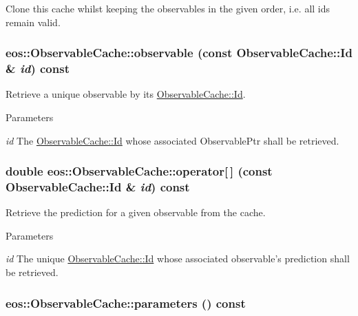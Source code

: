 Clone this cache whilst keeping the observables in the given order, i.e. all ids remain valid. \hypertarget{classeos_1_1ObservableCache_a171e7c1c0e4e2741dc155e4b249bca6d}{
\subsubsection[{observable}]{ eos::ObservableCache::observable (const {\bf ObservableCache::Id} \& {\em id}) const}}
\label{classeos_1_1ObservableCache_a171e7c1c0e4e2741dc155e4b249bca6d}
Retrieve a unique observable by its \hyperlink{classeos_1_1ObservableCache_a393f1d7c8c2a58bc95845e12b615c6ee}{ObservableCache::Id}.


\begin{DoxyParams}{Parameters}
\item[{\em id}]The \hyperlink{classeos_1_1ObservableCache_a393f1d7c8c2a58bc95845e12b615c6ee}{ObservableCache::Id} whose associated ObservablePtr shall be retrieved. \end{DoxyParams}
\hypertarget{classeos_1_1ObservableCache_a9ad7f1672817b0d69bda7dfc9471bc43}{
\subsubsection[{operator[]}]{\setlength{\rightskip}{0pt plus 5cm}double eos::ObservableCache::operator\mbox{[}$\,$\mbox{]} (const {\bf ObservableCache::Id} \& {\em id}) const}}
\label{classeos_1_1ObservableCache_a9ad7f1672817b0d69bda7dfc9471bc43}
Retrieve the prediction for a given observable from the cache.


\begin{DoxyParams}{Parameters}
\item[{\em id}]The unique \hyperlink{classeos_1_1ObservableCache_a393f1d7c8c2a58bc95845e12b615c6ee}{ObservableCache::Id} whose associated observable's prediction shall be retrieved. \end{DoxyParams}
\hypertarget{classeos_1_1ObservableCache_ac4dafff6d4eb3b29157d5f326b880c85}{
\subsubsection[{parameters}]{ eos::ObservableCache::parameters () const}}
\label{classeos_1_1ObservableCache_ac4dafff6d4eb3b29157d5f326b880c85}


